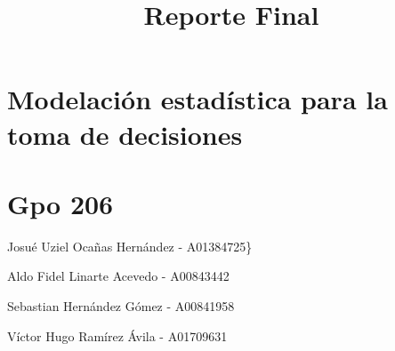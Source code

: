 \documentclass[
]{article}
\title{Reporte Final}
\author{}
\date{\vspace{-2.5em}}
\begin{document}
\maketitle

\section{Modelación estadística para la toma de
decisiones}\label{modelaciuxf3n-estaduxedstica-para-la-toma-de-decisiones}

\section{Gpo 206}\label{gpo-206}

Josué Uziel Ocañas Hernández - A01384725\}

Aldo Fidel Linarte Acevedo - A00843442

Sebastian Hernández Gómez - A00841958

Víctor Hugo Ramírez Ávila - A01709631
\end{document}
